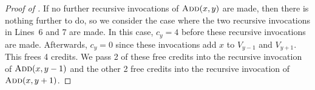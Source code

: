 \documentclass[kpfonts]{patmorin}
\begin{document}
\begin{proof}[Proof of ]
  If no further recursive invocations of $\textsc{Add}(x,y)$ are made, then there is nothing further to do, so we consider the case where the two recursive invocations in Lines~6 and 7 are made.  In this case, $c_y=4$ before these recursive invocations are made.  Afterwards, $c_y=0$ since these invocations add $x$ to $V_{y-1}$ and $V_{y+1}$.  This frees 4 credits.  We pass 2 of these free credits into the recursive invocation of $\textsc{Add}(x,y-1)$ and the other 2 free credits into the recursive invocation of $\textsc{Add}(x,y+1)$. 
\end{proof}
\end{document}
